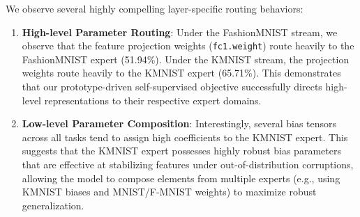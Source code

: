 \documentclass{article}
\theoremstyle{plain}
\theoremstyle{definition}
\theoremstyle{remark}
\begin{document}
We observe several highly compelling layer-specific routing behaviors:
\begin{enumerate}
    \item \textbf{High-level Parameter Routing}: Under the FashionMNIST stream, we observe that the feature projection weights (\texttt{fc1.weight}) route heavily to the FashionMNIST expert (51.94\%). Under the KMNIST stream, the projection weights route heavily to the KMNIST expert (65.71\%). This demonstrates that our prototype-driven self-supervised objective successfully directs high-level representations to their respective expert domains.
    \item \textbf{Low-level Parameter Composition}: Interestingly, several bias tensors across all tasks tend to assign high coefficients to the KMNIST expert. This suggests that the KMNIST expert possesses highly robust bias parameters that are effective at stabilizing features under out-of-distribution corruptions, allowing the model to compose elements from multiple experts (e.g., using KMNIST biases and MNIST/F-MNIST weights) to maximize robust generalization.
\end{enumerate}
\end{document}
